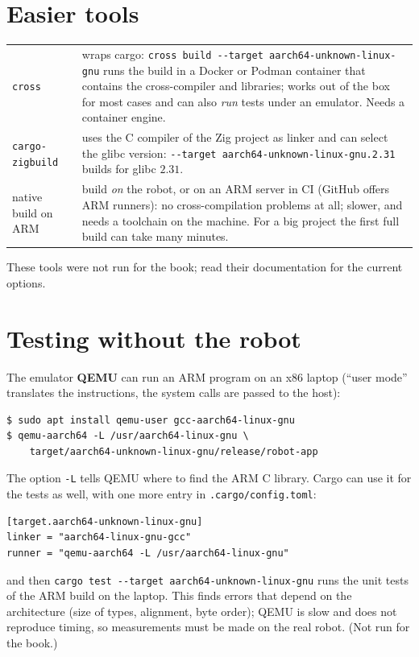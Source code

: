 \section*{Easier tools}
\begin{center}
\renewcommand{\arraystretch}{1.2}
\begin{tabular}{lp{9.4cm}}
\verb!cross! & wraps cargo: \verb!cross build --target aarch64-unknown-linux-gnu! runs the build in a Docker or Podman container that contains the cross-compiler and libraries; works out of the box for most cases and can also \emph{run} tests under an emulator. Needs a container engine.\\
\verb!cargo-zigbuild! & uses the C compiler of the Zig project as linker and can select the glibc version: \verb!--target aarch64-unknown-linux-gnu.2.31! builds for glibc $2.31$.\\
native build on ARM & build \emph{on} the robot, or on an ARM server in CI (GitHub offers ARM runners): no cross-compilation problems at all; slower, and needs a toolchain on the machine. For a big project the first full build can take many minutes.\\
\end{tabular}
\end{center}
These tools were not run for the book; read their documentation for the current options.

\section*{Testing without the robot}
The emulator \textbf{QEMU} can run an ARM program on an x86 laptop (``user mode'' translates the instructions, the system calls are passed to the host):
\begin{verbatim}
$ sudo apt install qemu-user gcc-aarch64-linux-gnu
$ qemu-aarch64 -L /usr/aarch64-linux-gnu \
    target/aarch64-unknown-linux-gnu/release/robot-app
\end{verbatim}
The option \verb!-L! tells QEMU where to find the ARM C library. Cargo can use it for the tests as well, with one more entry in \verb!.cargo/config.toml!:
\begin{verbatim}
[target.aarch64-unknown-linux-gnu]
linker = "aarch64-linux-gnu-gcc"
runner = "qemu-aarch64 -L /usr/aarch64-linux-gnu"
\end{verbatim}
and then \verb!cargo test --target aarch64-unknown-linux-gnu! runs the unit tests of the ARM build on the laptop. This finds errors that depend on the architecture (size of types, alignment, byte order); QEMU is slow and does not reproduce timing, so measurements must be made on the real robot. (Not run for the book.)

